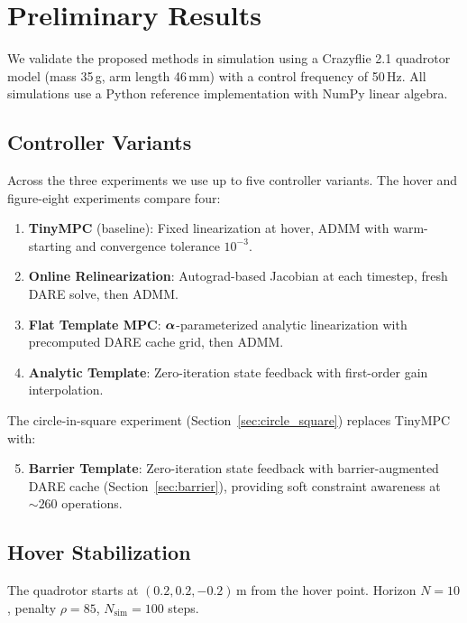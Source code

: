 \section{Preliminary Results}\label{sec:experiments}

We validate the proposed methods in simulation using
a Crazyflie 2.1 quadrotor model (mass 35\,g, arm length 46\,mm)
with a control frequency of 50\,Hz.
All simulations use a Python reference implementation
with NumPy linear algebra.

\subsection{Controller Variants}

Across the three experiments we use up to five controller variants.
The hover and figure-eight experiments compare four:
\begin{enumerate}
  \item \textbf{TinyMPC} (baseline): Fixed linearization at hover,
    ADMM with warm-starting and convergence tolerance $10^{-3}$.
  \item \textbf{Online Relinearization}: Autograd-based Jacobian
    at each timestep, fresh DARE solve, then ADMM.
  \item \textbf{Flat Template MPC}: $\bm{\alpha}$-parameterized analytic
    linearization with precomputed DARE cache grid, then ADMM.
  \item \textbf{Analytic Template}: Zero-iteration state feedback
    with first-order gain interpolation.
\end{enumerate}
The circle-in-square experiment (Section~\ref{sec:circle_square})
replaces TinyMPC with:
\begin{enumerate}
  \setcounter{enumi}{4}
  \item \textbf{Barrier Template}: Zero-iteration state feedback
    with barrier-augmented DARE cache (Section~\ref{sec:barrier}),
    providing soft constraint awareness at ${\sim}260$ operations.
\end{enumerate}

\subsection{Hover Stabilization}

The quadrotor starts at $(0.2, 0.2, -0.2)$\,m from the hover point.
Horizon $N=10$, penalty $\rho = 85$, $N_{\mathrm{sim}} = 100$ steps.


